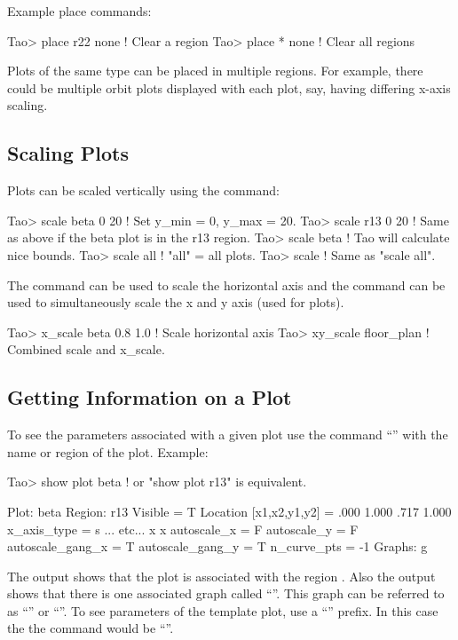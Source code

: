 \documentclass{hitec}     %
\begin{document}
Example place commands:
\begin{code}
Tao> place r22 none    ! Clear a region
Tao> place * none      ! Clear all regions
\end{code}

Plots of the same type can be placed in multiple regions. For example, there could be multiple
orbit plots displayed with each plot, say, having differing x-axis scaling.

\subsection{Scaling Plots}

Plots can be scaled vertically using the  command:
\begin{code}
Tao> scale beta 0 20  ! Set y_min = 0, y_max = 20.
Tao> scale r13 0 20   ! Same as above if the beta plot is in the r13 region.
Tao> scale beta       ! Tao will calculate nice bounds.
Tao> scale all        ! "all" = all plots.
Tao> scale            ! Same as "scale all".
\end{code}

The  command can be used to scale the horizontal axis and
the  command can be used to simultaneously scale the x and y axis 
(used for  plots).
\begin{code}
Tao> x_scale beta 0.8 1.0   ! Scale horizontal axis
Tao> xy_scale floor_plan    ! Combined scale and x_scale.
\end{code}

\subsection{Getting Information on a Plot}

To see the parameters associated with a given plot use the command ``''
with the name or region of the plot. Example:
\begin{code}
Tao> show plot beta  ! or "show plot r13" is equivalent.

Plot:  beta
Region:  r13
Visible                = T
Location [x1,x2,y1,y2] = .000  1.000  .717  1.000
x_axis_type          = s
... etc...
x%
x%
autoscale_x          = F
autoscale_y          = F
autoscale_gang_x     = T
autoscale_gang_y     = T
n_curve_pts          = -1
Graphs:
   g
\end{code}
The output shows that the  plot is associated with the region . Also the
output shows that there is one associated graph called ``''. This graph can be referred
to as ``'' or ``''. To see parameters of the  template plot,
use a ``'' prefix. In this case the the command would be ``''.
\end{document}
